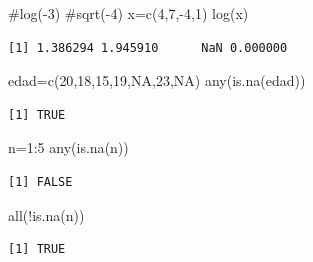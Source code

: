 \documentclass[
  ignorenonframetext,
  aspectratio=169,
  spanish,
]{beamer}
\newenvironment{Shaded}{\begin{snugshade}}{\end{snugshade}}
\newcommand{\CommentTok}[1]{\textcolor[rgb]{0.37,0.37,0.37}{#1}}
\newcommand{\ConstantTok}[1]{\textcolor[rgb]{0.56,0.35,0.01}{#1}}
\newcommand{\DecValTok}[1]{\textcolor[rgb]{0.68,0.00,0.00}{#1}}
\newcommand{\FunctionTok}[1]{\textcolor[rgb]{0.28,0.35,0.67}{#1}}
\newcommand{\NormalTok}[1]{\textcolor[rgb]{0.00,0.23,0.31}{#1}}
\newcommand{\OtherTok}[1]{\textcolor[rgb]{0.00,0.23,0.31}{#1}}
\newcommand{\SpecialCharTok}[1]{\textcolor[rgb]{0.37,0.37,0.37}{#1}}
\begin{document}
\begin{frame}[fragile]{}
\label{section-14}
\begin{Shaded}
\begin{Highlighting}[]
\CommentTok{\#log({-}3)}
\CommentTok{\#sqrt({-}4)}
\NormalTok{x}\OtherTok{=}\FunctionTok{c}\NormalTok{(}\DecValTok{4}\NormalTok{,}\DecValTok{7}\NormalTok{,}\SpecialCharTok{{-}}\DecValTok{4}\NormalTok{,}\DecValTok{1}\NormalTok{)  }
\FunctionTok{log}\NormalTok{(x) }
\end{Highlighting}
\end{Shaded}

\begin{verbatim}
[1] 1.386294 1.945910      NaN 0.000000
\end{verbatim}
\end{frame}

\begin{frame}[fragile]{}
\label{section-15}
\begin{Shaded}
\begin{Highlighting}[]
\NormalTok{edad}\OtherTok{=}\FunctionTok{c}\NormalTok{(}\DecValTok{20}\NormalTok{,}\DecValTok{18}\NormalTok{,}\DecValTok{15}\NormalTok{,}\DecValTok{19}\NormalTok{,}\ConstantTok{NA}\NormalTok{,}\DecValTok{23}\NormalTok{,}\ConstantTok{NA}\NormalTok{)  }
\FunctionTok{any}\NormalTok{(}\FunctionTok{is.na}\NormalTok{(edad))}
\end{Highlighting}
\end{Shaded}

\begin{verbatim}
[1] TRUE
\end{verbatim}

\begin{Shaded}
\begin{Highlighting}[]
\NormalTok{n}\OtherTok{=}\DecValTok{1}\SpecialCharTok{:}\DecValTok{5}
\FunctionTok{any}\NormalTok{(}\FunctionTok{is.na}\NormalTok{(n))}
\end{Highlighting}
\end{Shaded}

\begin{verbatim}
[1] FALSE
\end{verbatim}

\begin{Shaded}
\begin{Highlighting}[]
\FunctionTok{all}\NormalTok{(}\SpecialCharTok{!}\FunctionTok{is.na}\NormalTok{(n)) }
\end{Highlighting}
\end{Shaded}

\begin{verbatim}
[1] TRUE
\end{verbatim}
\end{frame}
\end{document}
